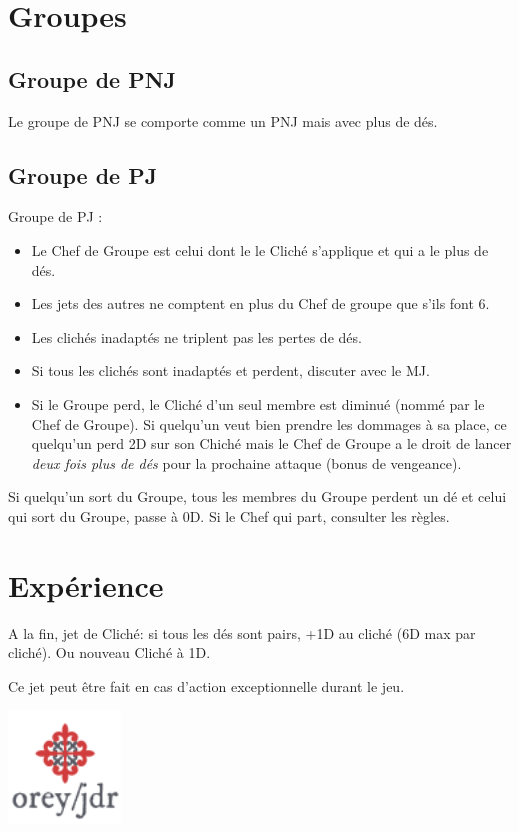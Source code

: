 \documentclass[a4paper, 11pt, twocolumn, twoside]{article}
\begin{document}
\section{Groupes}
\label{sec:org451c24b}

\subsection{Groupe de PNJ}
\label{sec:orgbcada5f}

Le groupe de PNJ se comporte comme un PNJ mais avec plus de dés.

\subsection{Groupe de PJ}
\label{sec:org5b87b7c}

Groupe de PJ :

\begin{itemize}
\item Le Chef de Groupe est celui dont le le Cliché s'applique et qui a le plus de dés.
\item Les jets des autres ne comptent en plus du Chef de groupe que s'ils font 6.
\item Les clichés inadaptés ne triplent pas les pertes de dés.
\item Si tous les clichés sont inadaptés et perdent, discuter avec le MJ.
\item Si le Groupe perd, le Cliché d'un seul membre est diminué (nommé par le Chef de Groupe). Si quelqu'un veut bien prendre les dommages à sa place, ce quelqu'un perd 2D sur son Chiché mais le Chef de Groupe a le droit de lancer \emph{deux fois plus de dés} pour la prochaine attaque (bonus de vengeance).
\end{itemize}

Si quelqu'un sort du Groupe, tous les membres du Groupe perdent un dé et celui qui sort du Groupe, passe à 0D. Si le Chef qui part, consulter les règles.

\section{Expérience}
\label{sec:orge8276f1}

A la fin, jet de Cliché: si tous les dés sont pairs, +1D au cliché (6D max par cliché). Ou nouveau Cliché à 1D.

Ce jet peut être fait en cas d'action exceptionnelle durant le jeu.


\vfill

\begin{center}
\includegraphics[width=3cm]{logo-orey.png}
\end{center}
\end{document}
